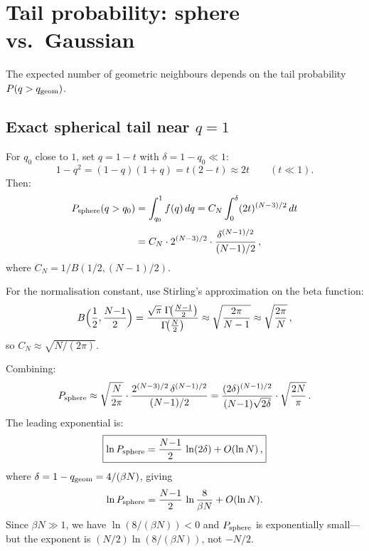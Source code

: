 \documentclass[11pt]{article}
\begin{document}
\section{Tail probability: sphere vs.\ Gaussian}
\label{sec:tail}

The expected number of geometric neighbours depends on
the tail probability $P(q > q_{\rm geom})$.

\subsection{Exact spherical tail near $q = 1$}

For $q_0$ close to $1$, set $q = 1 - t$ with
$\delta = 1 - q_0 \ll 1$:
\begin{equation}
  1 - q^2 = (1-q)(1+q) = t(2-t) \approx 2t
  \qquad (t \ll 1).
\end{equation}
Then:
\begin{align}
  P_{\rm sphere}(q > q_0)
  &= \int_{q_0}^{1} f(q)\,dq
  = C_N \int_0^{\delta}(2t)^{(N-3)/2}\,dt
  \nonumber\\[3pt]
  &= C_N \cdot 2^{(N-3)/2}
    \cdot \frac{\delta^{(N-1)/2}}{(N{-}1)/2}\,,
  \label{eq:Psphere}
\end{align}
where $C_N = 1/B(1/2,(N{-}1)/2)$.

For the normalisation constant, use Stirling's approximation
on the beta function:
\begin{equation}
  B\Bigl(\frac{1}{2},\frac{N{-}1}{2}\Bigr)
  = \frac{\sqrt{\pi}\;\Gamma\!\bigl(\frac{N-1}{2}\bigr)}
         {\Gamma\!\bigl(\frac{N}{2}\bigr)}
  \approx \sqrt{\frac{2\pi}{N-1}}
  \approx \sqrt{\frac{2\pi}{N}}\,,
\end{equation}
so $C_N \approx \sqrt{N/(2\pi)}$.

Combining:
\begin{equation}\label{eq:Psphere_full}
  P_{\rm sphere}
  \approx \sqrt{\frac{N}{2\pi}}
  \cdot \frac{2^{(N-3)/2}\,\delta^{(N-1)/2}}{(N{-}1)/2}
  = \frac{(2\delta)^{(N-1)/2}}{(N{-}1)\sqrt{2\delta}}
    \cdot \sqrt{\frac{2N}{\pi}}\,.
\end{equation}
The leading exponential is:
\begin{equation}\label{eq:lnPsphere}
  \boxed{%
  \ln P_{\rm sphere}
  = \frac{N{-}1}{2}\,\ln(2\delta)
  + O(\ln N)\,,}
\end{equation}
where $\delta = 1 - q_{\rm geom} = 4/(\beta N)$, giving
\begin{equation}\label{eq:lnPsphere_explicit}
  \ln P_{\rm sphere}
  = \frac{N{-}1}{2}\,\ln\frac{8}{\beta N}
  + O(\ln N).
\end{equation}
Since $\beta N \gg 1$, we have $\ln(8/(\beta N)) < 0$
and $P_{\rm sphere}$ is exponentially small---but the
exponent is $(N/2)\ln(8/(\beta N))$, not $-N/2$.
\end{document}
